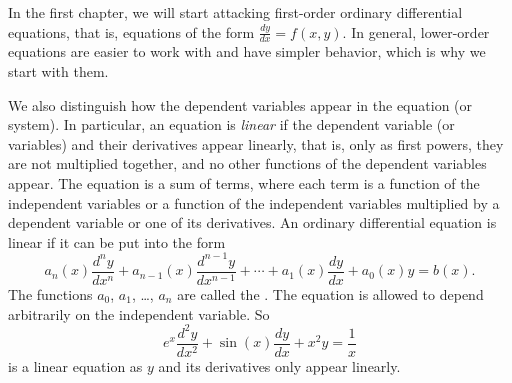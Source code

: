 In the first chapter, we will start attacking first-order ordinary
differential equations, that is, equations of the form $\frac{dy}{dx} = f(x,y)$.
In general, lower-order equations are easier to work with and have simpler
behavior, which is why we start with them.

\medskip

We also distinguish how the dependent variables appear in the equation (or
system).  In particular, an equation is
\emph{linear} if the
dependent variable (or variables) and their derivatives appear linearly,
that is, only as first powers, they are not multiplied together,
and no other functions of the dependent
variables appear.  The equation is a sum of terms,
where each term is
a function of the independent variables
or
a function of the independent variables
multiplied by a dependent variable
or one of its derivatives.
An ordinary differential equation is linear if it can be
put into the form
\begin{equation} \label{classification:eqlingen}
a_n(x) \frac{d^n y}{dx^n} +
a_{n-1}(x) \frac{d^{n-1} y}{dx^{n-1}} +
\cdots
+
a_{1}(x) \frac{dy}{dx}
+
a_{0}(x) y = b(x) .
\end{equation}
The functions $a_0$, $a_1$, \ldots, $a_n$ are called the
\emph{}.
The equation is allowed to depend arbitrarily on the independent variable.
So
\begin{equation} \label{classification:eqlinex}
e^x \frac{d^2 y}{dx^2} +
\sin(x) \frac{d y}{dx} +
x^2 y
=
\frac{1}{x}
\end{equation}
is a linear equation as $y$ and its derivatives only appear linearly.

